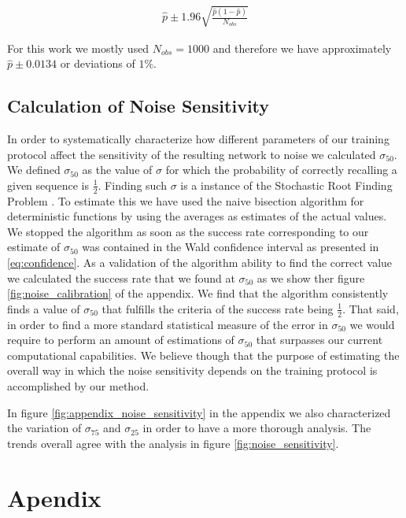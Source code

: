 \documentclass[10pt,a4paper]{article}
\begin{document}
\begin{align} 
\hat{p} \pm 1.96\sqrt{\frac{\hat{p}(1 - \hat{p})}{N_{obs} }} \label{eq:confidence}
\end{align}

For this work we mostly used $N_{obs}=1000$ and therefore we have approximately $\hat{p} \pm 0.0134$ or deviations of $1 \%$.  


\subsection{Calculation of Noise Sensitivity}
In order to systematically characterize how different parameters of our training protocol affect the sensitivity of the resulting network to noise we calculated $\sigma_{50}$. We defined $\sigma_{50}$ as the  value of $\sigma$ for which the probability of correctly recalling a given sequence is $\frac{1}{2}$. Finding such $\sigma$ is a instance of the Stochastic Root Finding Problem \cite{pasupathy2010choosing}. To estimate this we have used the naive bisection algorithm for deterministic functions by using the averages as estimates of the actual values. We stopped the algorithm as soon as the success rate corresponding to our estimate of $\sigma_{50}$ was contained in the Wald confidence interval as presented in \ref{eq:confidence}. As a validation of the algorithm ability to find the  correct value we calculated the success rate that we found at $\sigma_{50}$ as we show ther figure \ref{fig:noise_calibration} of the appendix. We find that the algorithm consistently finds a value of $\sigma_{50}$ that fulfills the criteria of the success rate being $\frac{1}{2}$. That said, in order to find a more standard statistical measure of the error in $\sigma_{50}$ we would require to perform an amount of estimations of $\sigma_{50}$ that surpasses our current computational capabilities. We believe though that the purpose of estimating the overall way in which the noise sensitivity depends on the training protocol is accomplished by our method. 

In figure \ref{fig:appendix_noise_sensitivity} in the appendix we also characterized the variation of $\sigma_{75}$ and $\sigma_{25}$  in order to have a more thorough analysis. The trends overall agree with the analysis in figure \ref{fig:noise_sensitivity}.  




\section{Apendix}
\end{document}

